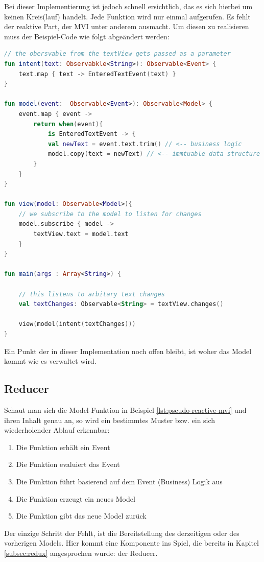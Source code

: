 Bei dieser Implementierung ist jedoch schnell ersichtlich, das es sich hierbei um keinen Kreis(lauf) handelt. Jede Funktion wird nur einmal aufgerufen. Es fehlt der reaktive Part, der MVI unter anderem ausmacht. Um diesen zu realisieren muss der Beispiel-Code wie folgt abgeändert werden:
\begin{lstlisting}[caption={pseudo mvi implementation},label={lst:pseudo-reactive-mvi},language=Kotlin]
// the obersvable from the textView gets passed as a parameter
fun intent(text: Observabkle<String>): Observable<Event> {
	text.map { text -> EnteredTextEvent(text) }
}

fun model(event:  Observable<Event>): Observable<Model> {
	event.map { event ->
		return when(event){
			is EnteredTextEvent -> {
			val newText = event.text.trim() // <-- business logic
			model.copy(text = newText) // <-- immtuable data structure
		}
	}	
}

fun view(model: Observable<Model>){
	// we subscribe to the model to listen for changes
	model.subscribe { model ->
		textView.text = model.text 	
	}	
}

fun main(args : Array<String>) {

	// this listens to arbitary text changes 
	val textChanges: Observable<String> = textView.changes()

	view(model(intent(textChanges))) 
}
\end{lstlisting}
Ein Punkt der in dieser Implementation noch offen bleibt, ist woher das Model kommt wie es verwaltet wird.

\subsection{Reducer}
Schaut man sich die Model-Funktion in Beispiel \ref{lst:pseudo-reactive-mvi} und ihren Inhalt genau an, so wird ein bestimmtes Muster bzw. ein sich wiederholender Ablauf erkennbar:
\\
\begin{enumerate}
	\item Die Funktion erhält ein Event 
	\item Die Funktion evaluiert das Event
	\item Die Funktion führt basierend auf dem Event (Business) Logik aus
	\item Die Funktion erzeugt ein neues Model
	\item Die Funktion gibt das neue Model zurück
\end{enumerate}
Der einzige Schritt der Fehlt, ist die Bereitstellung des derzeitigen oder des vorherigen Models. Hier kommt eine Komponente ins Spiel, die bereits in Kapitel \ref{subsec:redux} angesprochen wurde: der Reducer.

